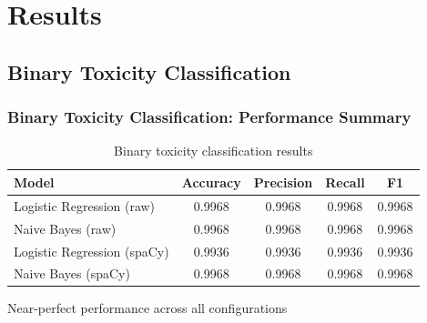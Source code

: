 \documentclass[aspectratio=169,xcolor=dvipsnames]{beamer}
\begin{document}
\section{Results}

\subsection{Binary Toxicity Classification}

\begin{frame}
\frametitle{Binary Toxicity Classification: Performance Summary}

\begin{table}
\centering
\begin{tabular}{lcccc}
\toprule
\textbf{Model} & \textbf{Accuracy} & \textbf{Precision} & \textbf{Recall} & \textbf{F1} \\
\midrule
Logistic Regression (raw) & 0.9968 & 0.9968 & 0.9968 & 0.9968 \\
Naive Bayes (raw) & 0.9968 & 0.9968 & 0.9968 & 0.9968 \\
Logistic Regression (spaCy) & 0.9936 & 0.9936 & 0.9936 & 0.9936 \\
Naive Bayes (spaCy) & 0.9968 & 0.9968 & 0.9968 & 0.9968 \\
\bottomrule
\end{tabular}
\caption{Binary toxicity classification results}
\end{table}

\vspace{0.2cm}
\begin{center}
\colorbox{blue!10}{\parbox{0.7\linewidth}{\centering Near-perfect performance across all configurations}}
\end{center}

\end{frame}
\end{document}
